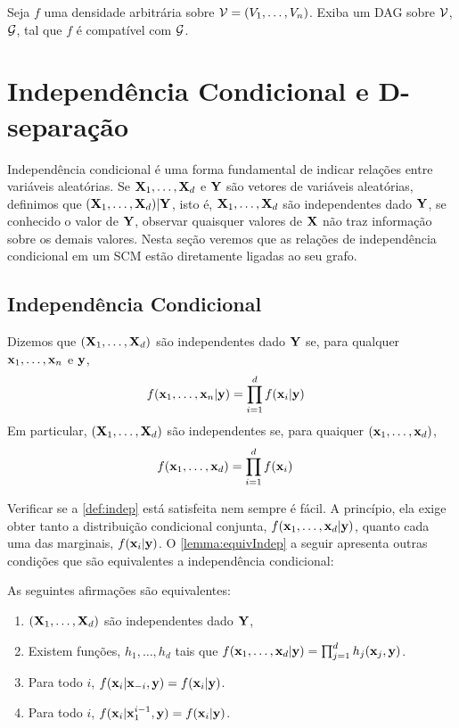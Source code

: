 \begin{exercise}
 Seja $f$ uma densidade arbitrária sobre ${\mathcal V} = (V_1,\ldots,V_n)$.
 Exiba um DAG sobre ${\mathcal V}$, ${\mathcal G}$,
 tal que $f$ é compatível com ${\mathcal G}$.
\end{exercise}

\section{Independência Condicional e D-separação}
\label{sec:d-sep}

Independência condicional é uma forma fundamental de
indicar relações entre variáveis aleatórias.
Se ${\mathbf{X}}_1,\ldots,{\mathbf{X}}_d$ e ${\mathbf{Y}}$ são vetores de variáveis aleatórias,
definimos que $({\mathbf{X}}_1,\ldots,{\mathbf{X}}_d) | {\mathbf{Y}}$, isto é,
${\mathbf{X}}_1,\ldots,{\mathbf{X}}_d$ são independentes dado ${\mathbf{Y}}$, se
conhecido o valor de ${\mathbf{Y}}$, 
observar quaisquer valores de ${\mathbf{X}}$ não traz 
informação sobre os demais valores.
Nesta seção veremos que 
as relações de independência condicional em um SCM
estão diretamente ligadas ao seu grafo.

\subsection{Independência Condicional}
\label{sec:indep}

\begin{definition}
 \label{def:indep}
 Dizemos que $({\mathbf{X}}_1,\ldots,{\mathbf{X}}_d)$ são independentes dado ${\mathbf{Y}}$ se,
 para qualquer ${\mathbf{x}}_1,\ldots,{\mathbf{x}}_n$ e ${\mathbf{y}}$,
 \begin{align*}
  f({\mathbf{x}}_1,\ldots,{\mathbf{x}}_n|{\mathbf{y}})	&= \prod_{i=1}^d f({\mathbf{x}}_i|{\mathbf{y}})
 \end{align*}
 Em particular, $({\mathbf{X}}_1,\ldots,{\mathbf{X}}_d)$ são independentes se,
 para quaiquer $({\mathbf{x}}_1,\ldots,{\mathbf{x}}_d)$,
 \begin{align*}
  f({\mathbf{x}}_1,\ldots,{\mathbf{x}}_d)	&= \prod_{i=1}^d f({\mathbf{x}}_i)
 \end{align*}
\end{definition}

Verificar se a \cref{def:indep} está satisfeita nem sempre é fácil.
A princípio, ela exige obter tanto a distribuição condicional conjunta, 
$f({\mathbf{x}}_1,\ldots,{\mathbf{x}}_d|{\mathbf{y}})$, quanto cada uma das marginais, $f({\mathbf{x}}_i|{\mathbf{y}})$.
O \cref{lemma:equivIndep} a seguir apresenta outras condições que
são equivalentes a independência condicional:

\begin{lemma}
 \label{lemma:equivIndep}
 As seguintes afirmações são equivalentes:
 \begin{enumerate}
  \item $({\mathbf{X}}_1,\ldots,{\mathbf{X}}_d)$ são independentes dado ${\mathbf{Y}}$,
  \item Existem funções, $h_1,\ldots,h_d$ tais que
  $f({\mathbf{x}}_1,\ldots,{\mathbf{x}}_d|{\mathbf{y}}) = \prod_{j=1}^{d}{h_j({\mathbf{x}}_j,{\mathbf{y}})}$.	
	\item Para todo $i$, 
	$f({\mathbf{x}}_i|{\mathbf{x}}_{-i},{\mathbf{y}}) = f({\mathbf{x}}_i|{\mathbf{y}})$.
	\item Para todo $i$,
	$f({\mathbf{x}}_i|{\mathbf{x}}_1^{i-1},{\mathbf{y}}) = f({\mathbf{x}}_i|{\mathbf{y}})$.
 \end{enumerate}
\end{lemma}

